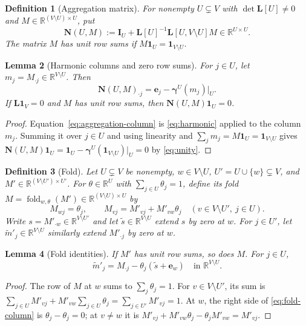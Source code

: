 \documentclass[11pt]{article}
\newtheorem{definition}{Definition}[section]
\newtheorem{lemma}[definition]{Lemma}
\newcommand{\R}{\mathbb R}
\newcommand{\one}{\mathbf 1}
\newcommand{\Id}{\mathbf I}
\newcommand{\Lmat}{\mathbf L}
\newcommand{\Nmat}{\mathbf N}
\newcommand{\gam}{\boldsymbol\gamma}
\begin{document}
\begin{definition}[Aggregation matrix]\label{def:aggregation}
For nonempty $U\subsetneq V$ with $\det\Lmat[U]\neq0$ and
$M\in\R^{(V\setminus U)\times U}$, put
\begin{equation}\label{eq:aggregation}
\Nmat(U,M)
:=\Id_U+\Lmat[U]^{-1}\Lmat[U,V\setminus U]M
\in\R^{U\times U}.
\end{equation}
The matrix $M$ has \emph{unit row sums} if
$M\one_U=\one_{V\setminus U}$.
\end{definition}

\begin{lemma}[Harmonic columns and zero row sums]\label{lem:aggregation}
For $j\in U$, let $m_j=M_{\cdot j}\in\R^{V\setminus U}$. Then
\begin{equation}\label{eq:aggregation-column}
\Nmat(U,M)_{\cdot j}
=\mathbf e_j-\gam^U(m_j)|_U.
\end{equation}
If $\Lmat\one_V=0$ and $M$ has unit row sums, then
$\Nmat(U,M)\one_U=0$.
\end{lemma}
\begin{proof}
Equation~\eqref{eq:aggregation-column} is
\eqref{eq:harmonic} applied to the column $m_j$. Summing it over
$j\in U$ and using linearity and
$\sum_jm_j=M\one_U=\one_{V\setminus U}$ gives
$\Nmat(U,M)\one_U=\one_U-\gam^U(\one_{V\setminus U})|_U=0$
by \eqref{eq:unity}.
\end{proof}

\begin{definition}[Fold]\label{def:fold}
Let $U\subsetneq V$ be nonempty, $w\in V\setminus U$,
$U'=U\cup\{w\}\subsetneq V$, and
$M'\in\R^{(V\setminus U')\times U'}$.
For $\theta\in\R^U$ with $\sum_{j\in U}\theta_j=1$, define its
fold $M=\operatorname{fold}_{w,\theta}(M')
\in\R^{(V\setminus U)\times U}$ by
\begin{equation}\label{eq:fold}
M_{wj}=\theta_j,
\qquad
M_{vj}=M'_{vj}+M'_{vw}\theta_j
\quad(v\in V\setminus U',\ j\in U).
\end{equation}
Write $s=M'_{\cdot w}\in\R^{V\setminus U'}$ and let
$\widetilde s\in\R^{V\setminus U}$ extend $s$ by zero at $w$.
For $j\in U'$, let $\widetilde m'_j\in\R^{V\setminus U}$ similarly
extend $M'_{\cdot j}$ by zero at $w$.
\end{definition}

\begin{lemma}[Fold identities]\label{lem:fold}
If $M'$ has unit row sums, so does $M$. For $j\in U$,
\begin{equation}\label{eq:fold-column}
\widetilde m'_j=M_{\cdot j}
 -\theta_j(\widetilde s+\mathbf e_w)
\quad\text{in }\R^{V\setminus U}.
\end{equation}
\end{lemma}
\begin{proof}
The row of $M$ at $w$ sums to $\sum_j\theta_j=1$. For
$v\in V\setminus U'$, its sum is
$\sum_{j\in U}M'_{vj}+M'_{vw}\sum_{j\in U}\theta_j
=\sum_{j\in U'}M'_{vj}=1$.
At $w$, the right side of \eqref{eq:fold-column} is
$\theta_j-\theta_j=0$; at $v\neq w$ it is
$M'_{vj}+M'_{vw}\theta_j-\theta_jM'_{vw}=M'_{vj}$.
\end{proof}
\end{document}
